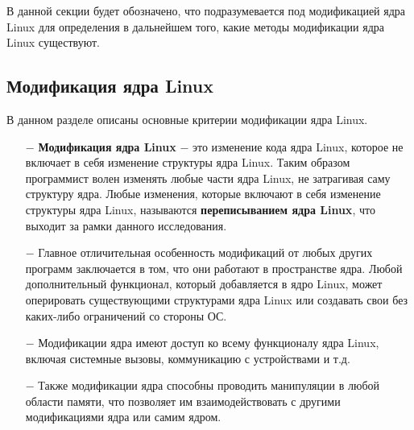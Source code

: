 В данной секции будет обозначено, что подразумевается под модификацией ядра Linux для определения в дальнейшем того, какие методы модификации ядра Linux существуют.

\subsection{Модификация ядра Linux}\label{subsec:--anal--methods--mod}

В данном разделе описаны основные критерии модификации ядра Linux.

\begin{itemize}
    \item[$-$] \textbf{Модификация ядра Linux} $-$ это изменение кода ядра Linux, которое не включает в себя изменение структуры ядра Linux.
    Таким образом программист волен изменять любые части ядра Linux, не затрагивая саму структуру ядра.
    Любые изменения, которые включают в себя изменение структуры ядра Linux, называются \textbf{переписыванием ядра Linux}, что выходит за рамки данного исследования.
    \item[$-$] Главное отличительная особенность модификаций от любых других программ заключается в том, что они работают в пространстве ядра.
    Любой дополнительный функционал, который добавляется в ядро Linux, может оперировать существующими структурами ядра Linux или создавать свои без каких-либо ограничений со стороны ОС.
    \item[$-$] Модификации ядра имеют доступ ко всему функционалу ядра Linux, включая системные вызовы, коммуникацию с устройствами и т.д.
    \item[$-$] Также модификации ядра способны проводить манипуляции в любой области памяти, что позволяет им взаимодействовать с другими модификациями ядра или самим ядром.
\end{itemize}

